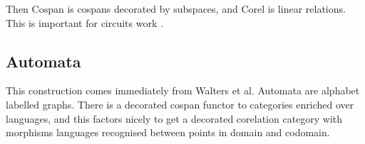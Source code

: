 Then $\mathrm{Cospan}$ is cospans decorated by subspaces, and $\mathrm{Corel}$
is linear relations. This is important for circuits work \cite{BF,BSZ}.

\subsection{Automata}
This construction comes immediately from Walters et al. Automata are alphabet
labelled graphs. There is a decorated cospan functor to categories enriched over
languages, and this factors nicely to get a decorated corelation category with
morphisms languages recognised between points in domain and codomain.







%
